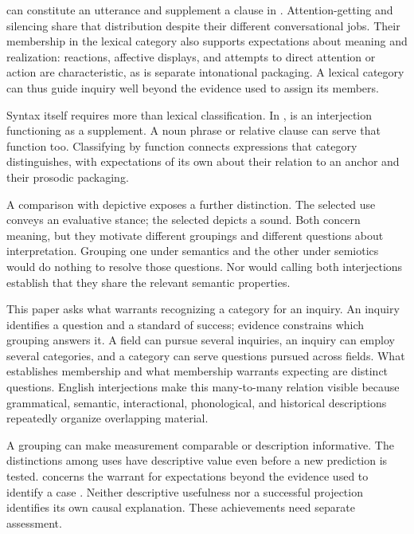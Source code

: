 \documentclass[12pt]{article}
\begin{document}
 can
constitute an utterance and supplement a clause in . Attention-getting  and silencing  share
that distribution despite their different conversational jobs. Their
membership in the lexical category also supports expectations about
meaning and realization: reactions, affective displays, and attempts to
direct attention or action are characteristic, as is separate intonational
packaging. A lexical category can thus guide inquiry well beyond the
evidence used to assign its members.

Syntax itself requires more than lexical classification. In
,  is an
interjection functioning as a supplement. A noun phrase or relative
clause can serve that function too. Classifying by function connects
expressions that category distinguishes, with expectations of its own
about their relation to an anchor and their prosodic packaging.

A comparison with depictive  exposes a further distinction.
The selected  use conveys an evaluative stance; the selected
 depicts a sound. Both concern meaning, but they motivate
different groupings and different questions about interpretation. Grouping
one under semantics and the other under semiotics would do nothing to
resolve those questions. Nor would calling both interjections establish
that they share the relevant semantic properties.

This paper asks what warrants recognizing a category for an inquiry.
An inquiry identifies a question and a standard of success; evidence
constrains which grouping answers it. A field can pursue several inquiries,
an inquiry can employ several categories, and a category can serve questions
pursued across fields. What establishes membership and what membership
warrants expecting are distinct questions. English interjections make this many-to-many relation
visible because grammatical, semantic, interactional, phonological, and
historical descriptions repeatedly organize overlapping material.

A grouping can make measurement comparable or description informative.
The distinctions among  uses have descriptive value even
before a new prediction is tested.  concerns the
warrant for expectations beyond the evidence used to identify a case
\citep{Goodman1955}. Neither descriptive usefulness nor a successful
projection identifies its own causal explanation. These achievements
need separate assessment.
\end{document}
